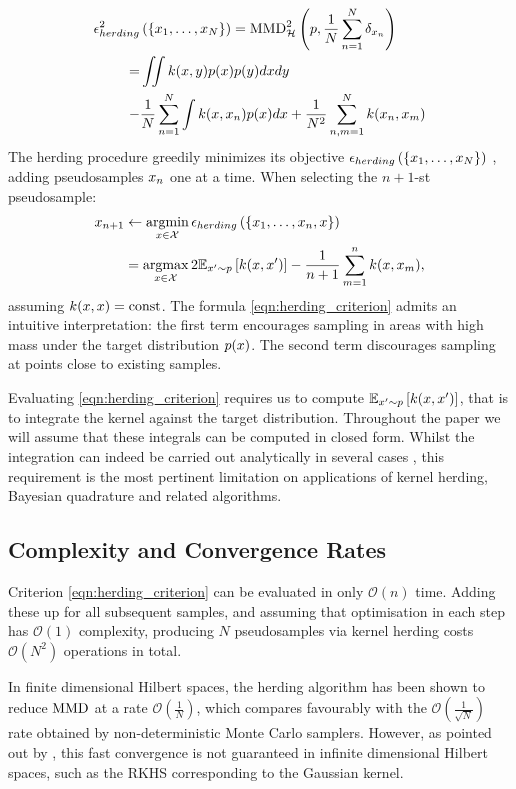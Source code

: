 \documentclass[]{article}
\begin{document}
\begin{align}
	\epsilon^2_{herding}&\left(\{{x}_1,\ldots,{x}_{N}\}\right) = {\rm MMD}^2_{\mathcal{H}}\left(p,\frac{1}{N}\sum_{n=1}^{N}\delta_{x_n}\right)\\
\nonumber	=&\iint k(x,y) p(x) p(y) dx dy\\
		- &\frac{1}{N}\sum_{n=1}^{N}\int k(x,x_n) p(x) dx
		+ \frac{1}{N^2}\sum_{n,m=1}^{N} k(x_n,x_m)
\label{eq:mmd_assumption}
\end{align}
%
The herding procedure greedily minimizes its objective $\epsilon_{herding}\left(\{{x}_1,\ldots,{x}_{N}\}\right)$ , adding pseudosamples ${x}_n$ one at a time. When selecting the $n+1$-st pseudosample:
%
\begin{align}
\vx_{n+1} &\leftarrow \argmin_{\vx \in \mathcal{X}} \label{eqn:herding_criterion} \epsilon_{herding}\left(\{\vx_1,\ldots,\vx_{n},\vx\}\right)\\
	&= \argmax_{\vx \in \mathcal{X}} 2 \expectargs{\vx' \sim p}{k(\vx, \vx')} - \frac{1}{n+1}\sum_{m=1}^{n} k(\vx,\vx_m)\mbox{,}\notag
\end{align}
%
assuming $k({x},{x}) = \mbox{const}$.
The formula \eqref{eqn:herding_criterion} admits an intuitive interpretation: the first term encourages sampling in areas with high mass under the target distribution $p({x})$.  The second term discourages sampling at points close to existing samples. 

Evaluating \eqref{eqn:herding_criterion} requires us to compute $\mathbb{E}_{{x}' \sim p} \left[ {k({x}, {x}')} \right] $, that is to integrate the kernel against the target distribution. Throughout the paper we will assume that these integrals can be computed in closed form. Whilst the integration can indeed be carried out analytically in several cases \citep{Song2008,chen2010super}, this requirement is the most pertinent limitation on applications of kernel herding, Bayesian quadrature and related algorithms.

\subsection{Complexity and Convergence Rates}

Criterion \eqref{eqn:herding_criterion} can be evaluated in only $\mathcal{O}(n)$ time. Adding these up for all subsequent samples, and assuming that optimisation in each step has $\mathcal{O}(1)$ complexity, producing $N$ pseudosamples via kernel herding costs $\mathcal{O}(N^2)$ operations in total.

In finite dimensional Hilbert spaces, the herding algorithm has been shown to reduce ${\rm MMD}$ at a rate $\mathcal{O}(\frac{1}{N})$, which compares favourably with the $\mathcal{O}(\frac{1}{\sqrt{N}})$ rate obtained by non-deterministic Monte Carlo samplers. However, as pointed out by \cite{bach2012equivalence}, this fast convergence is not guaranteed in infinite dimensional Hilbert spaces, such as the RKHS corresponding to the Gaussian kernel.
\end{document}
